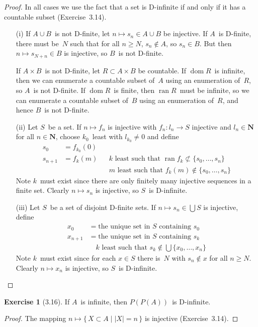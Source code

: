 \documentclass[letterpaper,12pt]{article}
\newcommand{\N}{\boldsymbol{N}}
\renewcommand{\P}{P}
\newcommand{\union}{\cup}
\newcommand{\bigunion}{\bigcup}
\DeclareMathOperator{\dom}{dom}
\DeclareMathOperator{\ran}{ran}
\newcommand{\card}[1]{|#1|}
\theoremstyle{definition}
\newtheorem*{exer}{Exercise}
\theoremstyle{remark}
\begin{document}
\begin{proof}
In all cases we use the fact that a set is D-infinite if and only if it has a countable subset (Exercise~3.14).
\begin{enumerate}[itemsep=0pt]
\item[(i)] If \(A\union B\)~is not D-finite, let \(n\mapsto s_n\in A\union B\) be injective. If \(A\)~is D-finite, there must be~\(N\) such that for all \(n\ge N\), \(s_n\not\in A\), so \(s_n\in B\). But then \(n\mapsto s_{N+n}\in B\) is injective, so \(B\)~is not D-finite.

If \(A\times B\)~is not D-finite, let \(R\subset A\times B\) be countable. If \(\dom R\)~is infinite, then we can enumerate a countable subset of~\(A\) using an enumeration of~\(R\), so \(A\)~is not D-finite. If \(\dom R\)~is finite, then \(\ran R\)~must be infinite, so we can enumerate a countable subset of~\(B\) using an enumeration of~\(R\), and hence \(B\)~is not D-finite.
\item[(ii)] Let \(S\)~be a set. If \(n\mapsto f_n\) is injective with \(f_n:l_n\to S\) injective and \(l_n\in\N\) for all \(n\in\N\), choose \(k_0\)~least with \(l_{k_0}\ne 0\) and define
\begin{align*}
s_0&=f_{k_0}(0)&&\\
s_{n+1}&=f_k(m)&&k\text{ least such that }\ran f_k\not\subset\{s_0,\ldots,s_n\}\\
	&&&m\text{ least such that }f_k(m)\not\in\{s_0,\ldots,s_n\}
\end{align*}
Note \(k\)~must exist since there are only finitely many injective sequences in a finite set. Clearly \(n\mapsto s_n\) is injective, so \(S\)~is D-infinite.
\item[(iii)] Let \(S\)~be a set of disjoint D-finite sets. If \(n\mapsto s_n\in\bigunion S\) is injective, define
\begin{align*}
x_0&=\text{the unique set in~\(S\) containing~\(s_0\)}\\
x_{n+1}&=\text{the unique set in~\(S\) containing~\(s_k\)}\\
	&\quad k\text{ least such that }s_k\not\in\bigunion\{x_0,\ldots,x_n\}
\end{align*}
Note \(k\)~must exist since for each \(x\in S\) there is~\(N\) with \(s_n\not\in x\) for all \(n\ge N\). Clearly \(n\mapsto x_n\) is injective, so \(S\)~is D-infinite.\qedhere
\end{enumerate}
\end{proof}

\begin{exer}[3.16]
If \(A\)~is infinite, then \(\P(\P(A))\)~is D-infinite.
\end{exer}
\begin{proof}
The mapping \(n\mapsto\{\,X\subset A\mid\card{X}=n\,\}\) is injective (Exercise~3.14).
\end{proof}
\end{document}
